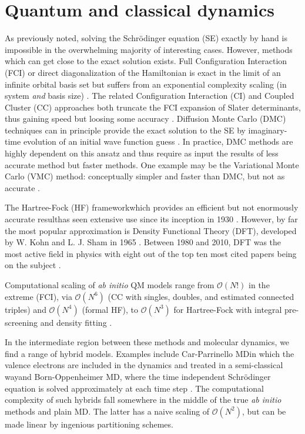 \documentclass[twoside,english]{uiofysmaster}
\renewcommand{\comment}[1]{\ignorespaces}
\begin{document}
\section{Quantum and classical dynamics}
As previously noted, solving the Schrödinger equation (SE) exactly 
by hand is impossible in the overwhelming majority of interesting cases. However, methods which can get close to the exact solution exists. Full Configuration Interaction (FCI) or direct diagonalization of the Hamiltonian is exact in the limit of an infinite orbital basis set but suffers from an exponential complexity scaling (in system \emph{and} basis size) \cite{helgaker}\comment{p525}. The related Configuration Interaction (CI) and Coupled Cluster (CC) approaches both truncate the FCI expansion of Slater determinants, thus gaining speed but loosing some accuracy \cite{kvaal,shavitt}\comment{ch6.3 ,ch 9}. Diffusion Monte Carlo (DMC) techniques can in principle provide the exact solution to the SE by imaginary-time evolution of an initial wave function guess \cite{hjorthjensen,hammond}\comment{p537,p87}. In practice, DMC methods are highly dependent on this ansatz and thus require as input the results of less accurate method but faster methods. One example may be the Variational Monte Carlo (VMC) method: conceptually simpler and faster than DMC, but not as accurate \cite{hammond,conroy,anderson}.

The Hartree-Fock (HF) framework\textemdash which provides an efficient but not enormously accurate result\textemdash has seen extensive use since its inception in 1930 \cite{hartree,fock,szabo}. However, by far the most popular approximation is Density Functional Theory (DFT), developed by W. Kohn and L. J. Sham in 1965 \cite{kohnsham,martin}. Between 1980 and 2010, DFT was the most active field in physics with eight out of the top ten most cited papers being on the subject \cite{dftperspective}.

Computational scaling of \emph{ab initio} QM models range from $\mathcal{O}(N!)$ in the extreme (FCI), via $\mathcal{O}(N^6)$ (CC with singles, doubles, and estimated connected triples) and $\mathcal{O}(N^4)$ (formal HF), to $\mathcal{O}(N^3)$ for Hartree-Fock with integral pre-screening and density fitting \cite{ratcliff}. 

In the intermediate region between these methods and molecular dynamics, we find a range of hybrid models. Examples include Car-Parrinello MD\textemdash in which the valence electrons are included in the dynamics and treated in a semi-classical way\textemdash and Born-Oppenheimer MD, where the time independent Schrödinger equation is solved approximately at each time step \cite{carparrinello,bomd1,bomd2}. The computational complexity of such hybrids fall somewhere in the middle of the true \emph{ab initio} methods and plain MD. The latter has a naive scaling of $\mathcal{O}(N^2)$, but can be made linear by ingenious partitioning schemes. 
\end{document}

